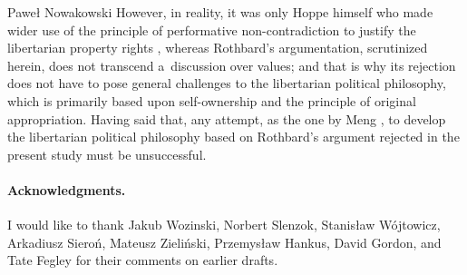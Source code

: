 \begin{artengenv}{Paweł Nowakowski}
However, in reality, it was only Hoppe himself who made wider use of the principle of performative non-contradiction to justify the libertarian property rights 
\parencites[see][]{Hoppe1988From}[][ch. 7]{Hoppe1989Theory}, %
 whereas Rothbard's argumentation, scrutinized herein, does not transcend a~discussion over values; and that is why its rejection does not have to pose general challenges to the libertarian political philosophy, which is primarily based upon self-ownership and the principle of original appropriation. Having said that, any attempt, as the one by Meng 
\parencite*[][]{Meng2002Hoppeing}, %
 to develop the libertarian political philosophy based on Rothbard's argument rejected in the present study must be unsuccessful.
 
 \paragraph{Acknowledgments.} 
 I would like to thank Jakub Wozinski, Norbert Slenzok, Stanisław Wójtowicz, Arkadiusz Sieroń, Mateusz Zieliński, Przemysław Hankus, David Gordon, and Tate Fegley for their comments on earlier drafts.




\end{artengenv}

\label{nowakowski-last}